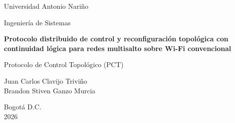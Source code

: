 \documentclass[12pt,a4paper,openany]{report}
\newcommand{\tesisTitulo}{Protocolo distribuido de control y reconfiguración topológica con continuidad lógica para redes multisalto sobre Wi-Fi convencional}
\newcommand{\tesisAutorA}{Juan Carlos Clavijo Triviño}
\newcommand{\tesisAutorB}{Brandon Stiven Ganzo Murcia}
\newcommand{\tesisUniversidad}{Universidad Antonio Nariño}
\newcommand{\tesisPrograma}{Ingeniería de Sistemas}
\newcommand{\tesisCiudad}{Bogotá D.C.}
\newcommand{\tesisAno}{2026}
\begin{document}
\begin{titlepage}
  \centering
  {\Large \tesisUniversidad\par}
  \vspace{0.5cm}
  {\large \tesisPrograma\par}
  \vspace{2cm}
  {\bfseries\LARGE \tesisTitulo\par}
  \vspace{1.5cm}
  {\large Protocolo de Control Topológico (PCT)\par}
  \vspace{2cm}
  {\large \tesisAutorA\\ \tesisAutorB\par}
  \vfill
  {\large \tesisCiudad\\ \tesisAno\par}
\end{titlepage}

\tableofcontents
\cleardoublepage













\end{document}
